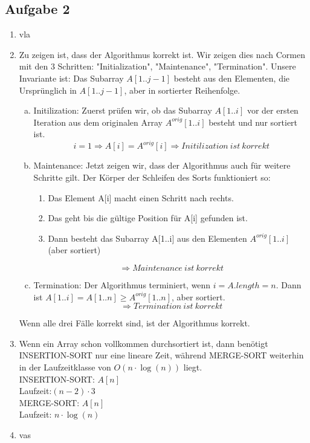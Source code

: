 \documentclass[a4paper,fleqn]{scrartcl}
\begin{document}
\subsection*{Aufgabe 2}
\begin{enumerate}[1.]
\item vla
\item Zu zeigen ist, dass der Algorithmus korrekt ist. Wir zeigen dies nach
Cormen mit den 3 Schritten: "Initialization", "Maintenance", "Termination".
Unsere Invariante ist: Das Subarray \(A[1..j-1]\) besteht aus den Elementen, die
Ursprünglich in \(A[1..j-1]\), aber in sortierter Reihenfolge.
\begin{enumerate}[(a)]
\item Initilization: Zuerst prüfen wir, ob das Subarray \(A[1..i]\) vor der
ersten Iteration aus dem originalen Array \(A^{orig}[1..i]\) besteht und
nur sortiert ist.
\[i = 1 \Rightarrow A[i] = A^{orig}[i] \Rightarrow Initilization\ ist\ korrekt\]
\item Maintenance: Jetzt zeigen wir, dass der Algorithmus auch für weitere Schritte gilt.
Der Körper der Schleifen des Sorts funktioniert so:
\begin{enumerate}
\item Das Element A[i] macht einen Schritt nach rechts.
\item Das geht bis die gültige Position für A[i] gefunden ist.
\item Dann besteht das Subarray A[1..i] aus den Elementen \(A^{orig}[1..i]\) (aber sortiert)
\end{enumerate}
\[\Rightarrow Maintenance\ ist\ korrekt\]
\item Termination: Der Algorithmus terminiert, wenn \(i=A.length = n\).
Dann ist \(A[1..i] = A[1..n] \geq A^{orig}[1..n]\), aber sortiert.
\[\Rightarrow Termination\ ist\ korrekt\]
\end{enumerate}
Wenn alle drei Fälle korrekt sind, ist der Algorithmus korrekt.

\item
Wenn ein Array schon vollkommen durchsortiert ist, dann benötigt INSERTION-SORT nur eine lineare Zeit, während MERGE-SORT weiterhin in der Laufzeitklasse von $O\left(n \cdot \log(n)\right)$ liegt. \\
INSERTION-SORT: $A[n]$ \\
Laufzeit:$(n-2)\cdot 3$ \\
MERGE-SORT: $A[n]$ \\
Laufzeit: $n\cdot \log(n)$
\item vas 
\end{enumerate}
\end{document}
